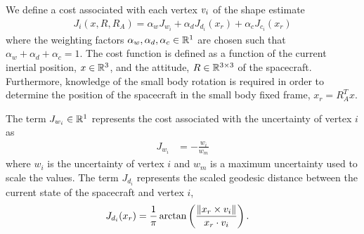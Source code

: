 \documentclass[letterpaper, paper,11pt]{AAS}		%
\begin{document}
We define a cost associated with each vertex \( v_i \) of the shape estimate
\begin{align}\label{eq:explore_cost}
    J_i (x, R, R_A) = \alpha_w J_{w_i} + \alpha_d J_{d_i}(x_r) + \alpha_c J_{c_i}(x_r)
\end{align}
where the weighting factors \( \alpha_w, \alpha_d, \alpha_c \in \mathbb{R}^1 \) are chosen such that \( \alpha_w + \alpha_d + \alpha_c = 1 \).
The cost function is defined as a function of the current inertial position, \( x \in \mathbb{R}^3 \), and the attitude, \( R \in \mathbb{R}^{3\times3}\) of the spacecraft.
Furthermore, knowledge of the small body rotation is required in order to determine the position of the spacecraft in the small body fixed frame, \( x_r = R_A^T x\).

The term \( J_{w_i} \in \mathbb{R}^1 \) represents the cost associated with the uncertainty of vertex \( i \) as
\begin{align}\label{eq:weight_cost}
    J_{w_i} &= - \frac{w_i}{w_m}
\end{align}
where \( w_i \) is the uncertainty of vertex \( i \) and \( w_m \) is a maximum uncertainty used to scale the values.
The term \( J_{d_i} \) represents the scaled geodesic distance between the current state of the spacecraft and vertex \( i \),
\begin{align}\label{eq:distance_cost}
    J_{d_i}(x_r) &= \frac{1}{\pi} \arctan \left(  \frac{\left\| x_r \times v_i \right\|}{x_r \cdot v_i} \right).
\end{align}
\end{document}

